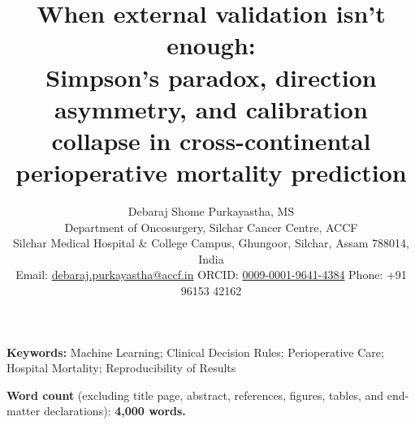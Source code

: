 \documentclass[11pt]{article}
\title{When external validation isn't enough:\\
Simpson's paradox, direction asymmetry, and calibration collapse in cross-continental perioperative mortality prediction}
\author{Debaraj Shome Purkayastha, MS\\
\small Department of Oncosurgery, Silchar Cancer Centre, ACCF\\
\small Silchar Medical Hospital \& College Campus, Ghungoor, Silchar, Assam 788014, India\\
\small Email: \href{mailto:debaraj.purkayastha@accf.in}{debaraj.purkayastha@accf.in} \quad
ORCID: \href{https://orcid.org/0009-0001-9641-4384}{0009-0001-9641-4384} \quad
Phone: +91 96153 42162}
\date{}
\begin{document}
\maketitle

\begin{center}
\noindent\textbf{Keywords:} Machine Learning; Clinical Decision Rules; Perioperative Care; Hospital Mortality; Reproducibility of Results

\medskip

\noindent\textbf{Word count} (excluding title page, abstract, references, figures, tables, and end-matter declarations): \textbf{4,000 words.}
\end{center}
\bigskip









\end{document}
